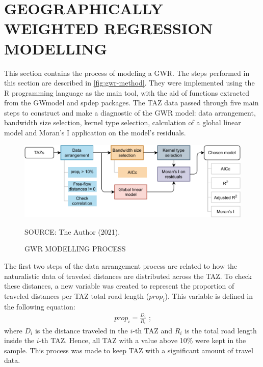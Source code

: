 \section{GEOGRAPHICALLY WEIGHTED REGRESSION MODELLING} \label{gwm}









This section contains the process of modeling a GWR. The steps performed in this section are described in \autoref{fig:gwr-method}. They were implemented using the R programming language as the main tool, with the aid of functions extracted from the GWmodel \cite{Gollini2013} and spdep \cite{Bivand2013} packages. The TAZ data passed through five main steps to construct and make a diagnostic of the GWR model: data arrangement,  bandwidth size selection, kernel type selection, calculation of a global linear model and Moran's I application on the model's residuals. 

\begin{figure}[!htbp]
    \centering\footnotesize
    \captionsetup{font=footnotesize}
    \caption{GWR MODELLING PROCESS}
    \includegraphics{fig/gwr-method.pdf}
    \label{fig:gwr-method}
    \par SOURCE: The Author (2021).
\end{figure}

The first two steps of the data arrangement process are related to how the naturalistic data of traveled distances are distributed across the TAZ. To check these distances, a new variable was created to represent the proportion of traveled distances per TAZ total road length ($prop_i$). This variable is defined in the following equation: \begin{align}
    prop_i = \frac{D_i}{R_i} \mbox{ ;}
\end{align} where $D_i$ is the distance traveled in the $i$-th TAZ and $R_i$ is the total road length inside the $i$-th TAZ. Hence, all TAZ with a value above 10\% were kept in the sample. This process was made to keep TAZ with a significant amount of travel data.

